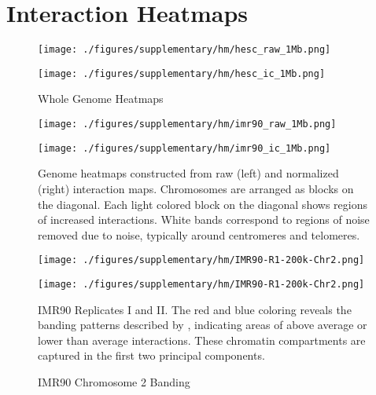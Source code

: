 \newpage
\section*{Interaction Heatmaps}

\begin{figure}[H]
  \caption{Whole Genome Heatmaps}\label{fig:WholeGenomeHeatmaps}
  \begin{minipage}{0.5\textwidth}%
    \texttt{[image: ./figures/supplementary/hm/hesc\_raw\_1Mb.png]}
  \end{minipage}%
  \hfill
  \begin{minipage}{0.5\textwidth}
    \texttt{[image: ./figures/supplementary/hm/hesc\_ic\_1Mb.png]}
  \end{minipage}
\end{figure}

\begin{figure}[H]
  \begin{minipage}{0.5\textwidth}%
    \texttt{[image: ./figures/supplementary/hm/imr90\_raw\_1Mb.png]}
  \end{minipage}%
  \hfill
  \begin{minipage}{0.5\textwidth}
    \texttt{[image: ./figures/supplementary/hm/imr90\_ic\_1Mb.png]}
  \end{minipage}
  \medskip
  \small
  Genome heatmaps constructed from raw (left) and normalized (right) interaction maps.
  Chromosomes are arranged as blocks on the diagonal.  Each light colored block on the
  diagonal shows regions of increased interactions.  White bands correspond to regions
  of noise removed due to noise, typically around centromeres and telomeres.
\end{figure}

\begin{figure}[H]
  \caption{IMR90 Chromosome 2 Banding}\label{fig:Chrom2Banding}
  \begin{minipage}{0.5\textwidth}%
    \texttt{[image: ./figures/supplementary/hm/IMR90-R1-200k-Chr2.png]}
  \end{minipage}%
  \hfill
  \begin{minipage}{0.5\textwidth}
    \texttt{[image: ./figures/supplementary/hm/IMR90-R1-200k-Chr2.png]}
  \end{minipage}
  \medskip
  \small
  IMR90 Replicates I and II\@.  The red and blue coloring reveals the banding patterns described by
  \citet{dekker2012}, indicating areas of above average or lower than average interactions.  These chromatin
  compartments are captured in the first two principal components.
\end{figure}


